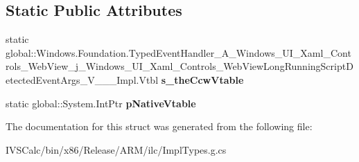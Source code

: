 \subsection*{Static Public Attributes}
\begin{DoxyCompactItemize}
\item 
\mbox{\label{struct_windows_1_1_foundation_1_1_typed_event_handler___a___windows___u_i___xaml___controls___we097668b3f317b53d2adba6098dff8aa2_a1eec5e6684adb1d6856c4f329ae79be6}} 
static global\+::\+Windows.\+Foundation.\+Typed\+Event\+Handler\+\_\+\+A\+\_\+\+Windows\+\_\+\+U\+I\+\_\+\+Xaml\+\_\+\+Controls\+\_\+\+Web\+View\+\_\+j\+\_\+\+Windows\+\_\+\+U\+I\+\_\+\+Xaml\+\_\+\+Controls\+\_\+\+Web\+View\+Long\+Running\+Script\+Detected\+Event\+Args\+\_\+\+V\+\_\+\+\_\+\+\_\+\+Impl.\+Vtbl {\bfseries s\+\_\+the\+Ccw\+Vtable}
\item 
\mbox{\label{struct_windows_1_1_foundation_1_1_typed_event_handler___a___windows___u_i___xaml___controls___we097668b3f317b53d2adba6098dff8aa2_a0425cfa8324a05712d206ee5b0991e32}} 
static global\+::\+System.\+Int\+Ptr {\bfseries p\+Native\+Vtable}
\end{DoxyCompactItemize}


The documentation for this struct was generated from the following file\+:\begin{DoxyCompactItemize}
\item 
I\+V\+S\+Calc/bin/x86/\+Release/\+A\+R\+M/ilc/Impl\+Types.\+g.\+cs\end{DoxyCompactItemize}
